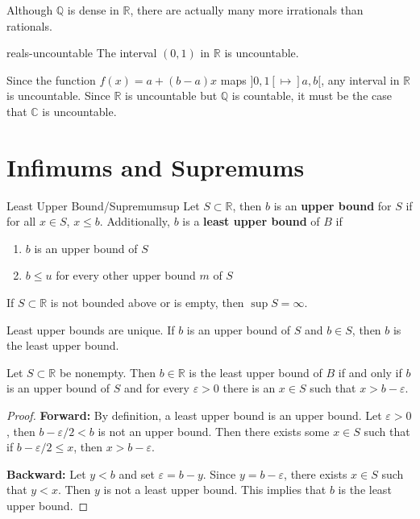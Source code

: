 \documentclass[10pt]{report}
\begin{document}
Although $\mathbb{Q}$ is dense in $\mathbb{R}$, there are actually many more irrationals than rationals.

\begin{thrm}{}{reals-uncountable}
	The interval $(0,1)$ in $\mathbb{R}$ is uncountable.
\end{thrm}

Since the function $f(x) = a + (b-a)x$ maps $]0,1[ \mapsto ]a,b[$, any interval in $\mathbb{R}$ is uncountable. Since $\mathbb{R}$ is uncountable but $\mathbb{Q}$ is countable, it must be the case that $\mathbb{C}$ is uncountable.

\section{Infimums and Supremums}

\begin{defn}{Least Upper Bound/Supremum}{sup}
	Let $S \subset \mathbb{R}$, then $b$ is an \textbf{upper bound} for $S$ if for all $x \in S$, $x \leq b$. Additionally, $b$ is a \textbf{least upper bound}  of $B$ if
	\begin{enumerate}
		\item $b$ is an upper bound of $S$ 
		\item $b \leq u$ for every other upper bound $m$ of $S$
	\end{enumerate}
	If $S \subset \mathbb{R}$ is not bounded above or is empty, then $ \sup S = \infty$.
\end{defn}

Least upper bounds are unique. If $b$ is an upper bound of $S$ and $b \in S$, then $b$ is the least upper bound.

\begin{prop}
	Let $S \subset \mathbb{R}$ be nonempty. Then $b \in \mathbb{R}$ is the least upper bound of $B$ if and only if $b$ is an upper bound of $S$ and for every $\varepsilon > 0$ there is an $x \in S$ such that $x > b-\varepsilon$.
\end{prop}
\begin{proof}
	\textbf{Forward:} By definition, a least upper bound is an upper bound. Let $\varepsilon>0$, then $b-\varepsilon/2<b$ is not an upper bound. Then there exists some $x\in S$ such that if $b-\varepsilon/2\leq x$, then $x>b-\varepsilon$.

	\textbf{Backward:} Let $y<b$ and set $\varepsilon=b-y$. Since $y=b-\varepsilon$, there exists $x\in S$ such that $y<x$. Then  $y$ is not a least upper bound. This implies that $b$ is the least upper bound.
\end{proof}
\end{document}
